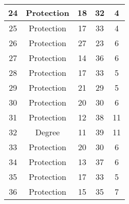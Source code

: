 \documentclass[results.tex]{subfiles}
\begin{document}
\begin{center}
\begin{tabular}{| c || c | c | c | c |}
            \hline
            24                      & Protection                   & 18                     & 32                      & 4                    \\
            \hline
            25                      & Protection                   & 17                     & 33                      & 4                    \\
            \hline
            26                      & Protection                   & 27                     & 23                      & 6                    \\
            \hline
            27                      & Protection                   & 14                     & 36                      & 6                    \\
            \hline
            28                      & Protection                   & 17                     & 33                      & 5                    \\
            \hline
            29                      & Protection                   & 21                     & 29                      & 5                    \\
            \hline
            30                      & Protection                   & 20                     & 30                      & 6                    \\
            \hline
            31                      & Protection                   & 12                     & 38                      & 11                   \\
            \hline
            32                      & Degree                       & 11                     & 39                      & 11                   \\
            \hline
            33                      & Protection                   & 20                     & 30                      & 6                    \\
            \hline
            34                      & Protection                   & 13                     & 37                      & 6                    \\
            \hline
            35                      & Protection                   & 17                     & 33                      & 5                    \\
            \hline
            36                      & Protection                   & 15                     & 35                      & 7                    \\

\end{tabular}
\end{center}
\end{document}
